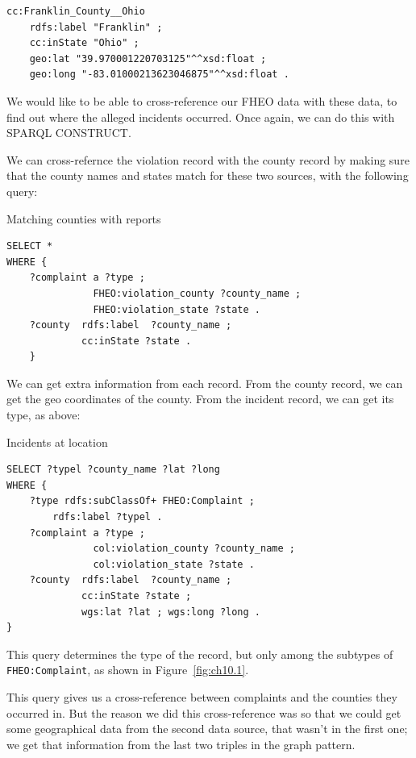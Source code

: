 \begin{lstlisting}
cc:Franklin_County__Ohio	
    rdfs:label "Franklin" ;
    cc:inState "Ohio" ;
	geo:lat "39.970001220703125"^^xsd:float ;
	geo:long "-83.01000213623046875"^^xsd:float .
\end{lstlisting}

We would like to be able to cross-reference our FHEO data with these
data, to find out where the alleged incidents occurred. Once again, we
can do this with SPARQL CONSTRUCT.

We can cross-refernce the violation record with the county record by 
making sure that the county names and states match for these two sources, with the following
query:

\begin{query}Matching counties with reports\end{query}
\begin{lstlisting}
SELECT *
WHERE {
    ?complaint a ?type ;
               FHEO:violation_county ?county_name ;
               FHEO:violation_state ?state .
    ?county  rdfs:label  ?county_name ;
             cc:inState ?state .
    }
\end{lstlisting}

We can get extra information from each record.  From the county record, 
we can get the geo coordinates of the county.  From the incident record, we can get 
its type, as above:

\begin{query}Incidents at location\end{query}
\begin{lstlisting}
SELECT ?typel ?county_name ?lat ?long 
WHERE {    
    ?type rdfs:subClassOf+ FHEO:Complaint ;
        rdfs:label ?typel .
    ?complaint a ?type ;
               col:violation_county ?county_name ;
               col:violation_state ?state .
    ?county  rdfs:label  ?county_name ;
             cc:inState ?state ;
             wgs:lat ?lat ; wgs:long ?long .
}
\end{lstlisting}

This query determines the type of the record, but only among the subtypes
of \texttt{FHEO:Complaint}, as shown in Figure~\ref{fig:ch10.1}.

This query gives us a cross-reference between complaints and the
counties they occurred in. But the reason we did this cross-reference
was so that we could get some geographical data from the second
data source, that wasn't in the first one; we get that information from
the last two triples in the graph pattern.

